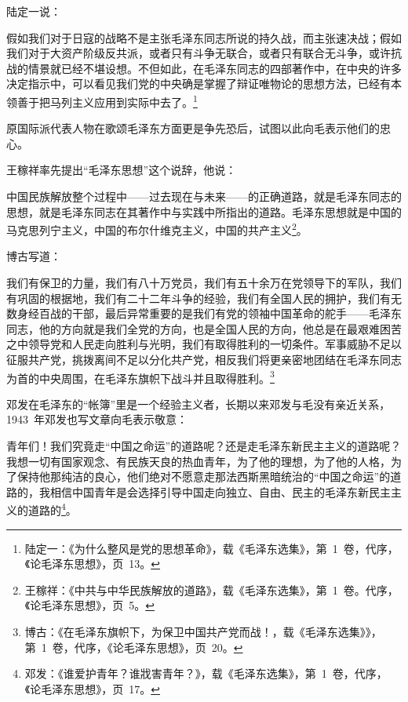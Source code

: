 陆定一说：

\begin{quoting}
假如我们对于日寇的战略不是主张毛泽东同志所说的持久战，而主张速决战；假如我们对于大资产阶级反共派，或者只有斗争无联合，或者只有联合无斗争，或许抗战的情景就已经不堪设想。不但如此，在毛泽东同志的四部著作中，在中央的许多决定指示中，可以看见我们党的中央确是掌握了辩证唯物论的思想方法，已经有本领善于把马列主义应用到实际中去了。\footnote{陆定一：《为什么整风是党的思想革命》，载《毛泽东选集》，第~1~卷，代序，《论毛泽东思想》，页~13。}
\end{quoting}

原国际派代表人物在歌颂毛泽东方面更是争先恐后，试图以此向毛表示他们的忠心。

王稼祥率先提出“毛泽东思想”这个说辞，他说：

\begin{quoting}
中国民族解放整个过程中——过去现在与未来——的正确道路，就是毛泽东同志的思想，就是毛泽东同志在其著作中与实践中所指出的道路。毛泽东思想就是中国的马克思列宁主义，中国的布尔什维克主义，中国的共产主义\footnote{王稼祥：《中共与中华民族解放的道路》，载《毛泽东选集》，第~1~卷。代序，《论毛泽东思想》，页~5。}。
\end{quoting}

博古写道：

\begin{quoting}
我们有保卫的力量，我们有八十万党员，我们有五十余万在党领导下的军队，我们有巩固的根据地，我们有二十二年斗争的经验，我们有全国人民的拥护，我们有无数身经百战的干部，最后异常重要的是我们有党的领袖中国革命的舵手——毛泽东同志，他的方向就是我们全党的方向，也是全国人民的方向，他总是在最艰难困苦之中领导党和人民走向胜利与光明，我们有取得胜利的一切条件。军事威胁不足以征服共产党，挑拨离间不足以分化共产党，相反我们将更亲密地团结在毛泽东同志为首的中央周围，在毛泽东旗帜下战斗并且取得胜利。\footnote{博古：《在毛泽东旗帜下，为保卫中国共产党而战！，载《毛泽东选集》》，第~1~卷，代序，《论毛泽东思想》，页~20。}
\end{quoting}

邓发在毛泽东的“帐簿”里是一个经验主义者，长期以来邓发与毛没有亲近关系，1943~年邓发也写文章向毛表示敬意：

\begin{quoting}
青年们！我们究竟走“中国之命运”的道路呢？还是走毛泽东新民主主义的道路呢？我想一切有国家观念、有民族天良的热血青年，为了他的理想，为了他的人格，为了保持他那纯洁的良心，他们绝对不愿意走那法西斯黑暗统治的“中国之命运”的道路的，我相信中国青年是会选择引导中国走向独立、自由、民主的毛泽东新民主主义的道路的\footnote{邓发：《谁爱护青年？谁戕害青年？》，载《毛泽东选集》，第~1~卷，代序，《论毛泽东思想》，页~17。}。
\end{quoting}

